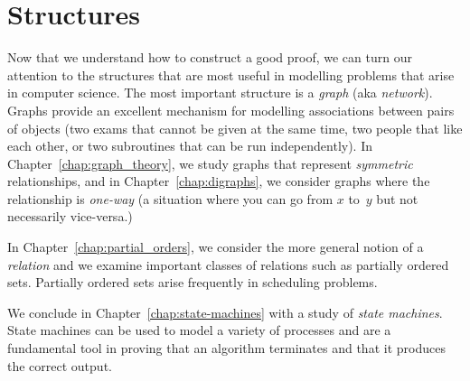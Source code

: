 \part{Structures}
\label{part:structures}

Now that we understand how to construct a good proof, we can turn our
attention to the structures that are most useful in modelling problems
that arise in computer science.  The most important structure is a
\emph{graph} (aka \emph{network}).  Graphs provide an excellent
mechanism for modelling associations between pairs of objects (\eg two
exams that cannot be given at the same time, two people that like each
other, or two subroutines that can be run independently).  In
Chapter~\ref{chap:graph_theory}, we study graphs that represent
\emph{symmetric} relationships, and in Chapter~\ref{chap:digraphs}, we
consider graphs where the relationship is \emph{one-way} (\eg a
situation where you can go from $x$ to~$y$ but not necessarily
vice-versa.)

In Chapter~\ref{chap:partial_orders}, we consider the more general
notion of a \emph{relation} and we examine important classes of
relations such as partially ordered sets.  Partially ordered sets
arise frequently in scheduling problems.

We conclude in Chapter~\ref{chap:state-machines} with a study of
\emph{state machines}.  State machines can be used to model a variety
of processes and are a fundamental tool in proving that an algorithm
terminates and that it produces the correct output.

\endinput
